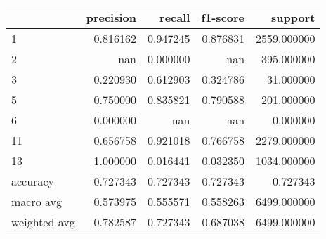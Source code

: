 \begin{tabular}{lrrrr}
\toprule
 & precision & recall & f1-score & support \\
\midrule
1 & 0.816162 & 0.947245 & 0.876831 & 2559.000000 \\
2 & nan & 0.000000 & nan & 395.000000 \\
3 & 0.220930 & 0.612903 & 0.324786 & 31.000000 \\
5 & 0.750000 & 0.835821 & 0.790588 & 201.000000 \\
6 & 0.000000 & nan & nan & 0.000000 \\
11 & 0.656758 & 0.921018 & 0.766758 & 2279.000000 \\
13 & 1.000000 & 0.016441 & 0.032350 & 1034.000000 \\
accuracy & 0.727343 & 0.727343 & 0.727343 & 0.727343 \\
macro avg & 0.573975 & 0.555571 & 0.558263 & 6499.000000 \\
weighted avg & 0.782587 & 0.727343 & 0.687038 & 6499.000000 \\
\bottomrule
\end{tabular}
